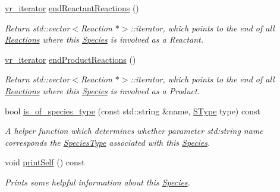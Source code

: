 \begin{DoxyCompactItemize}
\hyperlink{group__Chemistry_ga3ffcd49efdca1415b74d13f1b9fea3e4}{vr\-\_\-iterator} \hyperlink{group__Chemistry_ga6e3d0c6eb60588dc42141794cdcfedc4}{end\-Reactant\-Reactions} ()
\begin{DoxyCompactList}\small\item\em Return std\-::vector$<$\-Reaction $\ast$$>$\-::iterator, which points to the end of all \hyperlink{classReaction}{Reactions} where this \hyperlink{classSpecies}{Species} is involved as a Reactant. \end{DoxyCompactList}\item 
\hyperlink{group__Chemistry_ga3ffcd49efdca1415b74d13f1b9fea3e4}{vr\-\_\-iterator} \hyperlink{group__Chemistry_ga5d0ca77f38076795ae0c6b360ac2a583}{end\-Product\-Reactions} ()
\begin{DoxyCompactList}\small\item\em Return std\-::vector$<$\-Reaction $\ast$$>$\-::iterator, which points to the end of all \hyperlink{classReaction}{Reactions} where this \hyperlink{classSpecies}{Species} is involved as a Product. \end{DoxyCompactList}\item 
bool \hyperlink{group__Chemistry_ga6c195460f85013bc5d02202709bbfdfb}{is\-\_\-of\-\_\-species\-\_\-type} (const std\-::string \&name, \hyperlink{group__Chemistry_ga49104ff0a7d4118feb179c2f1c906f12}{S\-Type} type) const 
\begin{DoxyCompactList}\small\item\em A helper function which determines whether parameter std\-:string name corresponds the \hyperlink{classSpeciesType}{Species\-Type} associated with this \hyperlink{classSpecies}{Species}. \end{DoxyCompactList}\item 
void \hyperlink{group__Chemistry_gad49f156d0ec606b5b11fd4ffa64e454d}{print\-Self} () const 
\begin{DoxyCompactList}\small\item\em Prints some helpful information about this \hyperlink{classSpecies}{Species}. \end{DoxyCompactList}\end{DoxyCompactItemize}
